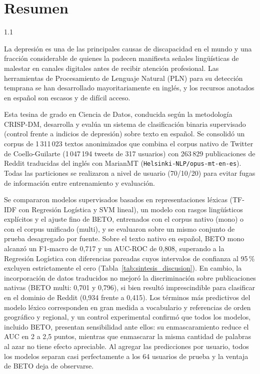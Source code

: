 \documentclass[12pt,a4paper]{article}
\begin{document}
\setcounter{page}{2}

\section*{Resumen}
\begin{spacing}{1.1}

La depresión es una de las principales causas de discapacidad en el mundo y una fracción considerable de quienes la padecen manifiesta señales lingüísticas de malestar en canales digitales antes de recibir atención profesional. Las herramientas de Procesamiento de Lenguaje Natural (PLN) para su detección temprana se han desarrollado mayoritariamente en inglés, y los recursos anotados en español son escasos y de difícil acceso.

Esta tesina de grado en Ciencia de Datos, conducida según la metodología CRISP-DM, desarrolla y evalúa un sistema de clasificación binaria supervisado (control frente a indicios de depresión) sobre texto en español. Se consolidó un corpus de 1\,311\,023 textos anonimizados que combina el corpus nativo de Twitter de Coello-Guilarte (1\,047\,194 tweets de 317 usuarios) con 263\,829 publicaciones de Reddit traducidas del inglés con MarianMT (\texttt{Helsinki-NLP/opus-mt-en-es}). Todas las particiones se realizaron a nivel de usuario (70/10/20) para evitar fugas de información entre entrenamiento y evaluación.

Se compararon modelos supervisados basados en representaciones léxicas (TF-IDF con Regresión Logística y SVM lineal), un modelo con rasgos lingüísticos explícitos y el ajuste fino de BETO, entrenados con el corpus nativo (mono) o con el corpus unificado (multi), y se evaluaron sobre un mismo conjunto de prueba desagregado por fuente. Sobre el texto nativo en español, BETO mono alcanzó un F1-macro de 0{,}717 y un AUC-ROC de 0{,}808, superando a la Regresión Logística con diferencias pareadas cuyos intervalos de confianza al 95\,\% excluyen estrictamente el cero (Tabla~\ref{tab:sintesis_discusion}). En cambio, la incorporación de datos traducidos no mejoró la discriminación sobre publicaciones nativas (BETO multi: 0{,}701 y 0{,}796), si bien resultó imprescindible para clasificar en el dominio de Reddit (0{,}934 frente a 0{,}415). Los términos más predictivos del modelo léxico corresponden en gran medida a vocabulario y referencias de orden geográfico y regional, y un control experimental confirmó que todos los modelos, incluido BETO, presentan sensibilidad ante ellos: su enmascaramiento reduce el AUC en 2 a 2{,}5 puntos, mientras que enmascarar la misma cantidad de palabras al azar no tiene efecto apreciable. Al agregar las predicciones por usuario, todos los modelos separan casi perfectamente a los 64 usuarios de prueba y la ventaja de BETO deja de observarse.


\end{spacing}
\end{document}
